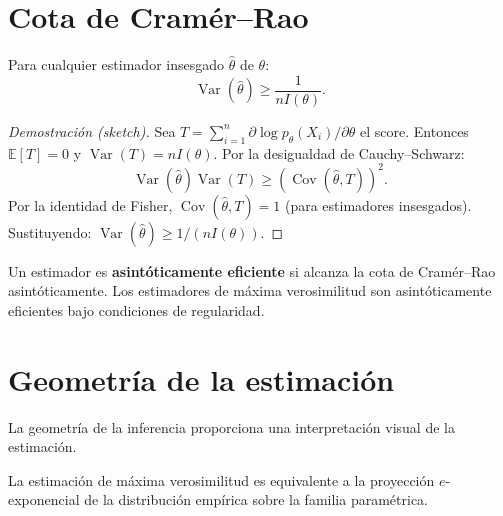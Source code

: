 \section{Cota de Cramér--Rao}

\begin{theorem}
	Para cualquier estimador insesgado $\hat\theta$ de $\theta$:
	\[
	\operatorname{Var}(\hat\theta) \ge \frac{1}{n I(\theta)}.
	\]
\end{theorem}

\begin{proof}[Demostración (sketch)]
	Sea $T = \sum_{i=1}^n \partial \log p_\theta(X_i)/\partial \theta$ el score.  Entonces $\mathbb{E}[T] = 0$ y $\operatorname{Var}(T) = n I(\theta)$.  Por la desigualdad de Cauchy--Schwarz:
	\[
	\operatorname{Var}(\hat\theta) \operatorname{Var}(T) \ge (\operatorname{Cov}(\hat\theta, T))^2.
	\]
	Por la identidad de Fisher, $\operatorname{Cov}(\hat\theta, T) = 1$ (para estimadores insesgados).  Sustituyendo: $\operatorname{Var}(\hat\theta) \ge 1/(n I(\theta))$.
\end{proof}

\begin{corollary}
	Un estimador es \textbf{asintóticamente eficiente} si alcanza la cota de Cramér--Rao asintóticamente.  Los estimadores de máxima verosimilitud son asintóticamente eficientes bajo condiciones de regularidad.
\end{corollary}

\section{Geometría de la estimación}

La geometría de la inferencia proporciona una interpretación visual de la estimación.

\begin{proposition}
	La estimación de máxima verosimilitud es equivalente a la proyección $e$-exponencial de la distribución empírica sobre la familia paramétrica.
\end{proposition}

\begin{center}
\end{center}

